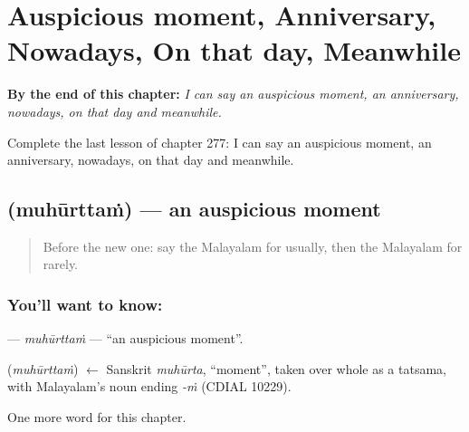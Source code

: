 
\chapter{Auspicious moment, Anniversary, Nowadays, On that day, Meanwhile}
\label{ch:ml-auspicious-moment-anniversary-nowadays-on-that-day-meanwhile}

\begin{chapteropening}
\textbf{By the end of this chapter:} \emph{I can say an auspicious moment, an anniversary, nowadays, on that day and meanwhile.}

Complete the last lesson of chapter 277: I can say an auspicious moment, an anniversary, nowadays, on that day and meanwhile.
\end{chapteropening}

\section[\texorpdfstring{\ml{മുഹൂർത്തം} (muhūrttaṁ)}{മുഹൂർത്തം (muhūrttaṁ)}]{ (muhūrttaṁ) — an auspicious moment}

\label{lesson:ML-C277-muhurttam}



\begin{quote}
Before the new one: say the Malayalam for usually, then the Malayalam for rarely.
\end{quote}

\subsection*{You'll want to know: }
\textbf{} — \emph{muhūrttaṁ} — \textquotedblleft{}an auspicious moment\textquotedblright{}.

\begin{cousinweb}
\textbf{} (\emph{muhūrttaṁ}) $\leftarrow$ Sanskrit \emph{muhūrta}, \textquotedblleft{}moment\textquotedblright{}, taken over whole as a tatsama, with Malayalam's noun ending \emph{-ṁ} (CDIAL 10229).
\end{cousinweb}

\begin{grammarlens}[title={What you've built}]
One more word for this chapter.
\end{grammarlens}

